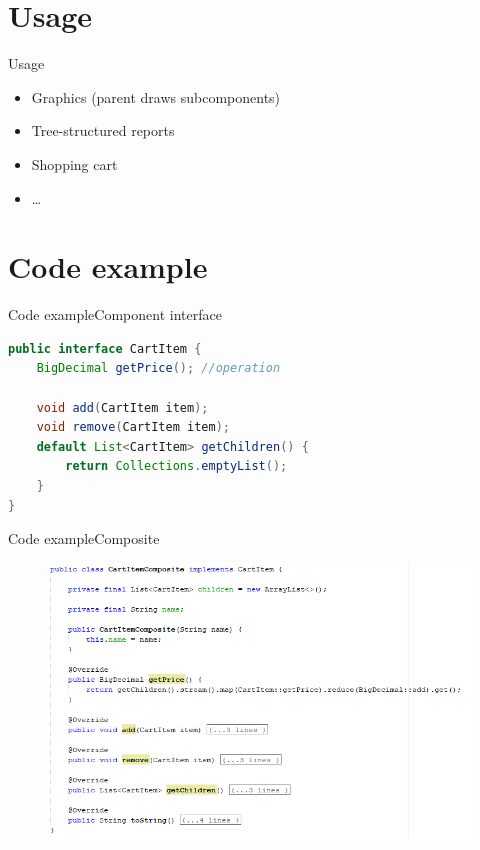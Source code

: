 \documentclass{beamer}
\begin{document}
\section{Usage}
\begin{frame}{Usage}
    \begin{itemize}
        \item Graphics (parent draws subcomponents)
        \item Tree-structured reports
        \item Shopping cart
        \item \ldots
    \end{itemize}
\end{frame}

\section{Code example}
\begin{frame}[fragile]{Code example}{Component interface}
    \begin{lstlisting}[language=Java]
public interface CartItem {
    BigDecimal getPrice(); //operation
    
    void add(CartItem item);
    void remove(CartItem item);
    default List<CartItem> getChildren() {
        return Collections.emptyList();
    }
}
    \end{lstlisting}
\end{frame}

\begin{frame}{Code example}{Composite}
    \begin{figure}[h]
        \centering
        \includegraphics[width=\textwidth]{compositeCode}
    \end{figure}
\end{frame}
\end{document}
